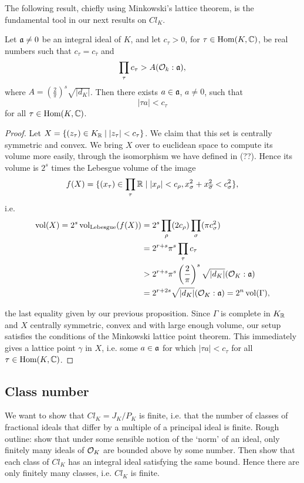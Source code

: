The following result, chiefly using Minkowski's lattice theorem, is the fundamental tool in our next results on $Cl_K$.

\begin{thm}[Neukirch 5.3]
	Let $\mathfrak{a}\neq 0$ be an integral ideal of $K$, and let $c_\tau>0$, for $\tau\in\text{Hom}(K,\mathbb{C})$, be real numbers such that $c_\tau=c_{\overline{\tau}}$ and
	\[
		\prod_\tau c_\tau > A(\mathcal{O}_k:\mathfrak{a}),
	\]
	where $A=\left(\frac{2}{\pi}\right)^s\sqrt{|d_K|}$. Then there exists $a\in\mathfrak{a}$, $a\neq 0$, such that
	\[
		|\tau a| < c_\tau
	\]
	for all $\tau\in\text{Hom}(K,\mathbb{C})$.
\end{thm}
\begin{proof}
	Let $X=\{(z_\tau)\in K_{\mathbb{R}} \mid |z_\tau| < c_\tau\}$. We claim that this set is centrally symmetric and convex. We bring $X$ over to euclidean space to compute its volume more easily, through the isomorphism we have defined in (??). Hence its volume is $2^s$ times the Lebesgue volume of the image
	\[
		f(X) = \{(x_\tau)\in\prod_\tau\mathbb{R} \mid |x_\rho| < c_\rho, x_{\sigma}^2+x_{\overline{\sigma}}^2 < c_{\sigma}^2\},
	\]
	i.e.
	\begin{align*}
		\operatorname{vol}(X) = 2^s \operatorname{vol}_{\text{Lebesgue}}(f(X)) &= 2^s\prod_\rho(2c_\rho)\prod_\sigma(\pi c_\sigma^2)\\
		&= 2^{r+s}\pi^s \prod_\tau c_\tau\\
		&> 2^{r+s}\pi^s \left(\frac{2}{\pi}\right)^s\sqrt{|d_K|}(\mathcal{O}_K:\mathfrak{a})\\
		&= 2^{r+2s}\sqrt{|d_K|}(\mathcal{O}_K:\mathfrak{a}) = 2^n\operatorname{vol}(\Gamma),
	\end{align*}

	the last equality given by our previous proposition. Since $\Gamma$ is complete in $K_{\mathbb{R}}$ and $X$ centrally symmetric, convex and with large enough volume, our setup satisfies the conditions of the Minkowski lattice point theorem. This immediately gives a lattice point $\gamma$ in $X$, i.e. some $a\in\mathfrak{a}$ for which $|\tau a|<c_\tau$ for all $\tau\in\text{Hom}(K,\mathbb{C})$.
\end{proof}



\subsection{Class number}

We want to show that $Cl_K=J_K/P_K$ is finite, i.e. that the number of classes of fractional ideals that differ by a multiple of a principal ideal is finite. Rough outline: show that under some sensible notion of the `norm' of an ideal, only finitely many ideals of $\mathcal{O}_K$ are bounded above by some number. Then show that each class of $Cl_K$ has an integral ideal satisfying the same bound. Hence there are only finitely many classes, i.e. $Cl_K$ is finite.

